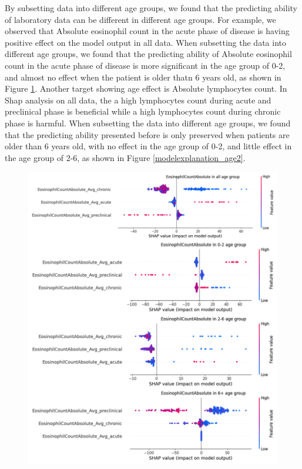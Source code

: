 \documentclass[final,3p,times,authoryear]{elsarticle}
\begin{document}
By subsetting data into different age groups, we found that the predicting ability of laboratory data can be different in different age groups. For example, we observed that Absolute eosinophil count in the acute phase of disease is having positive effect on the model output in all data. When subsetting the data into different age groups, we found that the predicting ability of Absolute eosinophil count in the acute phase of disease is more significant in the age group of 0-2, and almost no effect when the patient is older thatn 6 years old, as shown in Figure \ref{modelexplanation_age}.
Another target showing age effect is Absolute lymphocytes count. In Shap analysis on all data, the a high lymphocytes count during acute and preclinical phase is beneficial while a high lymphocytes count during chronic phase is harmful. When subsetting the data into different age groups, we found that the predicting ability presented before is only preserved when patients are older than 6 years old, with no effect in the age group of 0-2, and little effect in the age group of 2-6, as shown in Figure \ref{modelexplanation_age2}.
\begin{figure}[t]  
    \centering 
    \includegraphics[width=\textwidth]{figures/modelexplanation_age.png}
    \caption{}\label{modelexplanation_age}

\end{figure}
\end{document}

